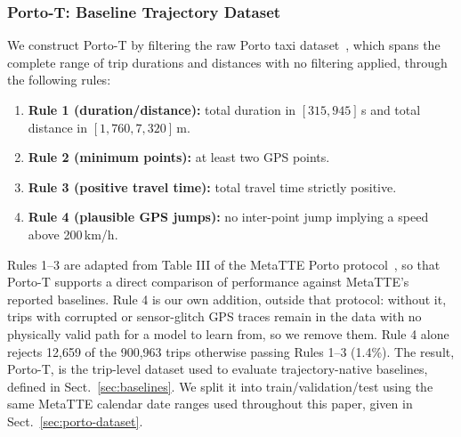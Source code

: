 \documentclass[pdflatex,sn-basic,Numbered]{sn-jnl}%
\begin{document}
\subsubsection{Porto-T: Baseline Trajectory Dataset}
We construct Porto-T by filtering the raw Porto taxi dataset~\cite{moreira2013porto}, which spans the complete range of trip durations and distances with no filtering applied, through the following rules:
\begin{enumerate}
    \item \textbf{Rule 1 (duration/distance):} total duration in $[315,945]$\,s and total distance in $[1{,}760,7{,}320]$\,m.
    \item \textbf{Rule 2 (minimum points):} at least two GPS points.
    \item \textbf{Rule 3 (positive travel time):} total travel time strictly positive.
    \item \textbf{Rule 4 (plausible GPS jumps):} no inter-point jump implying a speed above 200\,km/h.
\end{enumerate}
Rules 1--3 are adapted from Table III of the MetaTTE Porto protocol~\cite{wang2022metatte}, so that Porto-T supports a direct comparison of performance against MetaTTE's reported baselines. Rule 4 is our own addition, outside that protocol: without it, trips with corrupted or sensor-glitch GPS traces remain in the data with no physically valid path for a model to learn from, so we remove them. Rule 4 alone rejects 12,659 of the 900,963 trips otherwise passing Rules 1--3 (1.4\%). The result, Porto-T, is the trip-level dataset used to evaluate trajectory-native baselines, defined in Sect.~\ref{sec:baselines}. We split it into train/validation/test using the same MetaTTE calendar date ranges used throughout this paper, given in Sect.~\ref{sec:porto-dataset}.
\end{document}
